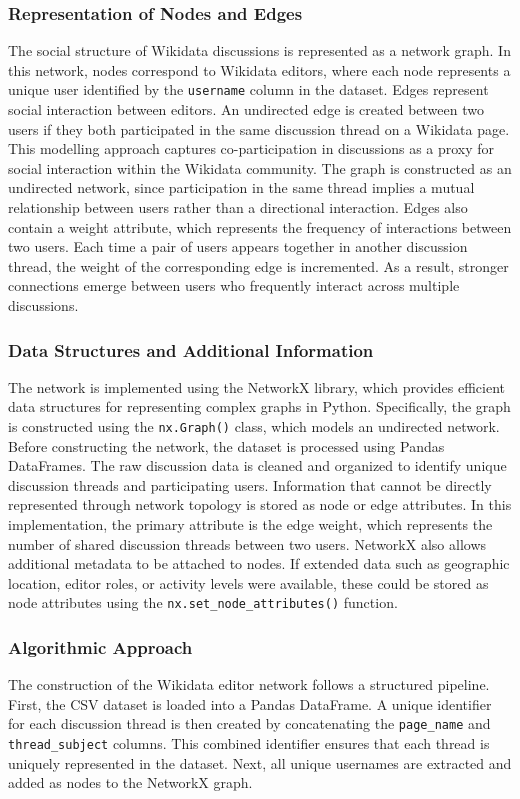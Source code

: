 \documentclass[conference]{IEEEtran}
\begin{document}
\subsubsection{Representation of Nodes and Edges}
The social structure of Wikidata discussions is represented as a network graph. In this network, nodes correspond to Wikidata editors, where each node represents a unique user identified by the \texttt{username} column in the dataset. Edges represent social interaction between editors. An undirected edge is created between two users if they both participated in the same discussion thread on a Wikidata page. This modelling approach captures co-participation in discussions as a proxy for social interaction within the Wikidata community. The graph is constructed as an undirected network, since participation in the same thread implies a mutual relationship between users rather than a directional interaction. Edges also contain a weight attribute, which represents the frequency of interactions between two users. Each time a pair of users appears together in another discussion thread, the weight of the corresponding edge is incremented. As a result, stronger connections emerge between users who frequently interact across multiple discussions.

\subsubsection{Data Structures and Additional Information}
The network is implemented using the NetworkX library, which provides efficient data structures for representing complex graphs in Python. Specifically, the graph is constructed using the \texttt{nx.Graph()} class, which models an undirected network. Before constructing the network, the dataset is processed using Pandas DataFrames. The raw discussion data is cleaned and organized to identify unique discussion threads and participating users. Information that cannot be directly represented through network topology is stored as node or edge attributes. In this implementation, the primary attribute is the edge weight, which represents the number of shared discussion threads between two users. NetworkX also allows additional metadata to be attached to nodes. If extended data such as geographic location, editor roles, or activity levels were available, these could be stored as node attributes using the \texttt{nx.set\_node\_attributes()} function.

\subsubsection{Algorithmic Approach}
The construction of the Wikidata editor network follows a structured pipeline. First, the CSV dataset is loaded into a Pandas DataFrame. A unique identifier for each discussion thread is then created by concatenating the \texttt{page\_name} and \texttt{thread\_subject} columns. This combined identifier ensures that each thread is uniquely represented in the dataset. Next, all unique usernames are extracted and added as nodes to the NetworkX graph. 
\end{document}
